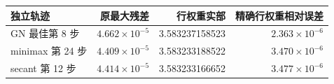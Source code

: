 \begin{tabular}{lrrr}
\toprule
独立轨迹 & 原最大残差 & 行权重实部 & 精确行权重相对误差 \\
\midrule
GN 最佳第 8 步 & $4.662\times10^{-5}$ & 3.583237158523 & $2.363\times10^{-6}$ \\
minimax 第 24 步 & $4.409\times10^{-5}$ & 3.583233188522 & $3.470\times10^{-6}$ \\
secant 第 12 步 & $4.414\times10^{-5}$ & 3.583233166652 & $3.477\times10^{-6}$ \\
\bottomrule
\end{tabular}
